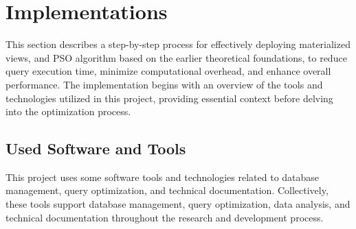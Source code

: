 \section{Implementations}
This section describes a step-by-step process for effectively deploying materialized views, and PSO algorithm based on the earlier theoretical foundations, to reduce query execution time, minimize computational overhead, and enhance overall performance. The implementation begins with an overview of the tools and technologies utilized in this project, providing essential context before delving into the optimization process.

\subsection{Used Software and Tools}
This project uses some software tools and technologies related to database management, query optimization, and technical documentation. Collectively, these tools support database management, query optimization, data analysis, and technical documentation throughout the research and development process.

